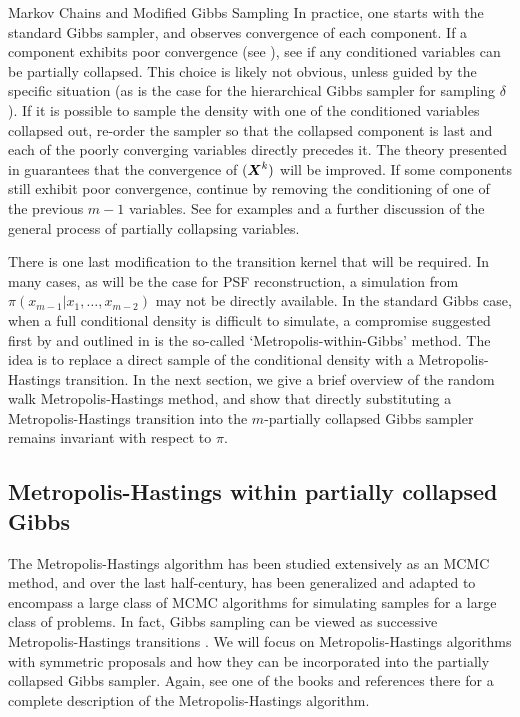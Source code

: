 \begin{chapter}{Markov Chains and Modified Gibbs Sampling}
In practice, one starts with the standard Gibbs sampler, and observes convergence of each component.
If a component exhibits poor convergence (see ), see if any conditioned variables can be partially collapsed.
This choice is likely not obvious, unless guided by the specific situation (as is the case for the hierarchical Gibbs sampler for sampling $\delta$).
If it is possible to sample the density with one of the conditioned variables collapsed out, re-order the sampler so that the collapsed component is last and each of the poorly converging variables directly precedes it. 
The theory presented in \citep{van2008partially} guarantees that the convergence of $(\mbox{\boldmath$X$}^k)$ will be improved.
If some components still exhibit poor convergence, continue by removing the conditioning of one of the previous $m-1$ variables.
See \citep{van2008partially} for examples and a further discussion of the general process of partially collapsing variables.

There is one last modification to the transition kernel that will be required.
In many cases, as will be the case for PSF reconstruction, a simulation from $\pi(x_{m-1}|x_1,\dots, x_{m-2})$ may not be directly available.
In the standard Gibbs case, when a full conditional density is difficult to simulate, a compromise suggested first by \citep{muller1992alternatives} and outlined in \citep{robert2013monte} is the so-called `Metropolis-within-Gibbs' method.
The idea is to replace a direct sample of the conditional density with a Metropolis-Hastings transition. 
In the next section, we give a brief overview of the random walk Metropolis-Hastings method, and show that directly substituting a Metropolis-Hastings transition into the $m$-partially collapsed Gibbs sampler remains invariant with respect to $\pi$.

\subsection{Metropolis-Hastings within partially collapsed Gibbs}
The Metropolis-Hastings algorithm \citep{metropolis1953equation} has been studied extensively as an MCMC method, and over the last half-century, has been generalized and adapted to encompass a large class of MCMC algorithms for simulating samples for a large class of problems. 
In fact, Gibbs sampling can be viewed as successive Metropolis-Hastings transitions \citep{robert2013monte}.
We will focus on Metropolis-Hastings algorithms with symmetric proposals and how they can be incorporated into the partially collapsed Gibbs sampler.
Again, see one of the books \citep{calvetti2007introduction,liu2008monte,robert2013monte} and references there for a complete description of the Metropolis-Hastings algorithm.


\end{chapter}
